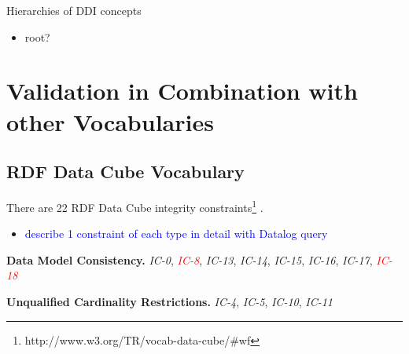 \documentclass{llncs}
\begin{document}
{Hierarchies of DDI concepts

\begin{itemize}
	\item root?
\end{itemize}

\section{Validation in Combination with other Vocabularies}

\subsection{RDF Data Cube Vocabulary}

There are 22 RDF Data Cube integrity constraints\footnote{http://www.w3.org/TR/vocab-data-cube/\#wf} \cite{CyganiakReynolds2014}.

\begin{itemize}
	\item \textcolor{blue}{describe 1 constraint of each type in detail with Datalog query}
\end{itemize}

\textbf{Data Model Consistency.}
{\em IC-0}, \textcolor{red}{{\em IC-8}}, {\em IC-13}, {\em IC-14}, {\em IC-15}, {\em IC-16}, {\em IC-17}, \textcolor{red}{{\em IC-18}}

\textbf{Unqualified Cardinality Restrictions.}
{\em IC-4}, {\em IC-5}, {\em IC-10}, {\em IC-11}

}
\end{document}
